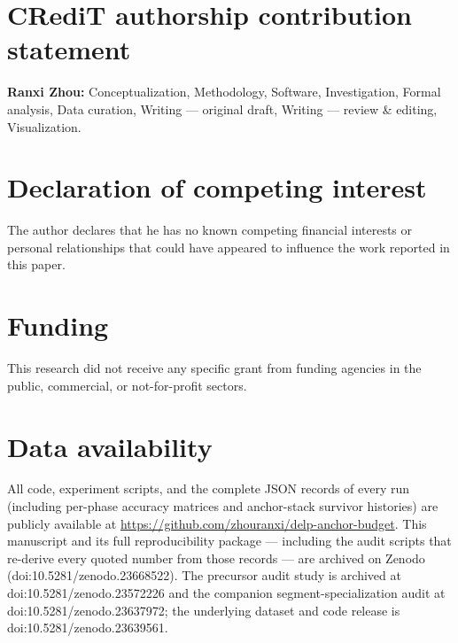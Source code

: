\documentclass[review,12pt,number]{elsarticle}
\begin{document}
\begin{table}[h]
\centering\small
\caption{$T{=}10$.}
\label{tab:appx-t10}

\end{table}

\begin{table}[h]
\centering\small
\caption{$T{=}20$.}
\label{tab:appx-t20}

\end{table}

\section*{CRediT authorship contribution statement}
\textbf{Ranxi Zhou:} Conceptualization, Methodology, Software,
Investigation, Formal analysis, Data curation, Writing --- original
draft, Writing --- review \& editing, Visualization.

\section*{Declaration of competing interest}
The author declares that he has no known competing financial interests
or personal relationships that could have appeared to influence the
work reported in this paper.

\section*{Funding}
This research did not receive any specific grant from funding agencies
in the public, commercial, or not-for-profit sectors.

\begin{sloppypar}
\section*{Data availability}
All code, experiment scripts, and the complete JSON records of every
run (including per-phase accuracy matrices and anchor-stack survivor
histories) are publicly available at
\url{https://github.com/zhouranxi/delp-anchor-budget}. This manuscript
and its full reproducibility package --- including the audit scripts
that re-derive every quoted number from those records --- are archived
on Zenodo (doi:10.5281/zenodo.23668522). The precursor audit study is
archived at doi:10.5281/zenodo.23572226 and the companion
segment-specialization audit at doi:10.5281/zenodo.23637972; the
underlying dataset and code release is
doi:10.5281/zenodo.23639561.
\end{sloppypar}
\end{document}
